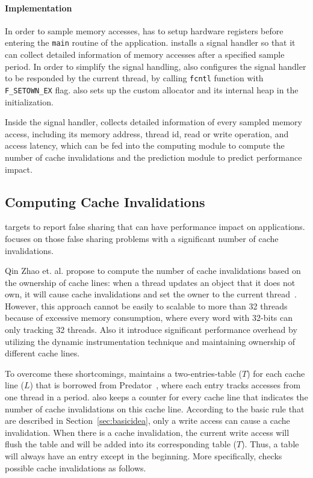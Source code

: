\paragraph{Implementation} 
In order to sample memory accesses, \cheetah{} has to setup hardware registers before entering the \texttt{main} routine of the application.  \Cheetah{} installs a signal handler so that it can collect detailed information of memory accesses after a specified sample period. In order to simplify the signal handling, \Cheetah{} also configures the signal handler to be responded by the current thread, by calling \texttt{fcntl} function with \texttt{F\_SETOWN\_EX} flag. \cheetah{} also sets up the custom allocator and its internal heap in the initialization.

Inside the signal handler, \Cheetah{} collects detailed information of every sampled memory access, including its memory address, thread id, read or write operation, and access latency, which can be fed into the computing module to compute the number of cache invalidations and the prediction module to predict performance impact.


\subsection{Computing Cache Invalidations}
\label{sec:computeinvalidations}

\Cheetah{} targets to report false sharing that can have performance impact on applications. \Cheetah{} focuses on those false sharing problems with a significant number of cache invalidations.  

Qin Zhao et. al. propose to compute the number of cache invalidations based on the ownership of cache lines: when a thread updates an object that it does not own, it will cause cache invalidations and set the owner to the current thread~\cite{qinzhao}. However, this approach cannot be easily to scalable to more than 32 threads because of excessive memory consumption, where every word with 32-bits can only tracking 32 threads. Also it introduce significant performance overhead by utilizing the dynamic instrumentation technique and maintaining ownership of different cache lines. 

To overcome these shortcomings, \Cheetah{} maintains a two-entries-table ($T$) for each cache line ($L$) that is borrowed from Predator~\cite{Predator}, where each entry tracks accesses from one thread in a period. \Cheetah{} also keeps a counter for every cache line that indicates the number of cache invalidations on this cache line.  
According to the basic rule that are described in Section~\ref{sec:basicidea}, only a write access can cause a cache invalidation. When there is a cache invalidation, the current write access will flush the table and will be added into its corresponding table ($T$). Thus, a table will always have an entry except in the beginning. More specifically, \cheetah{} checks possible cache invalidations as follows.
 
